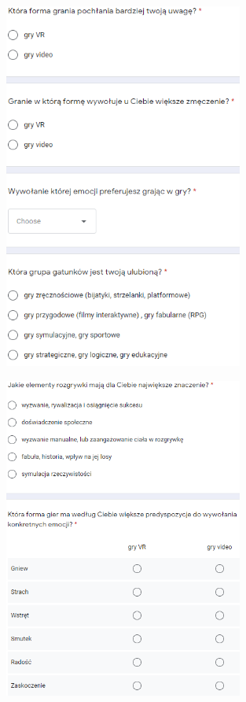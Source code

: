 \begin{figure}
	\centering
	\includegraphics[width=0.7\textwidth]{images/ankieta1234.PNG}
\end{figure}
\begin{figure}
	\centering
	\includegraphics[width=0.7\textwidth]{images/ankieta12345.PNG}
\end{figure}
